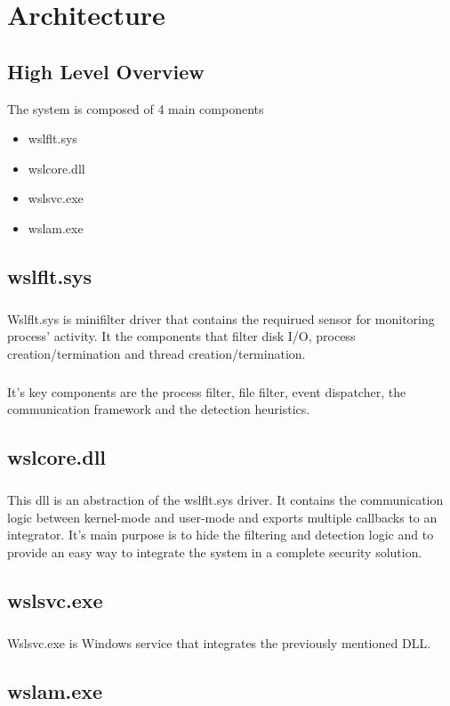 \chapter{Architecture}
    \section{High Level Overview}
        The system is composed of 4 main components
        \begin{itemize}
            \item wslflt.sys
            \item wslcore.dll
            \item wslsvc.exe
            \item wslam.exe
        \end{itemize}
    \section{wslflt.sys}
    \paragraph{}
    Wslflt.sys is minifilter driver that contains the requirued sensor for monitoring process' activity. It the components that filter disk I/O,
    process creation/termination and thread creation/termination.
    \paragraph{}
    It's key components are the process filter, file filter, event dispatcher, the communication framework and the detection heuristics.
    \section{wslcore.dll}
    \paragraph{}
    This dll is an abstraction of the wslflt.sys driver. It contains the communication logic between kernel-mode and user-mode and exports
    multiple callbacks to an integrator. It's main purpose is to hide the filtering and detection logic and to provide an easy way to integrate
    the system in a complete security solution.
    \paragraph{}
    \section{wslsvc.exe}
    \paragraph{}
    Wslsvc.exe is Windows service that integrates the previously mentioned DLL.
    \section{wslam.exe}
